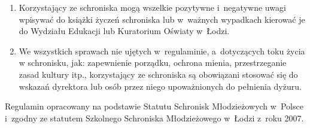 \begin{enumerate}
\item Korzystający ze schroniska mogą wszelkie pozytywne i~negatywne uwagi wpisywać do książki życzeń schroniska lub w~ważnych wypadkach kierować je do Wydziału Edukacji lub Kuratorium Oświaty w~Łodzi.
\item We wszystkich sprawach nie ujętych w~regulaminie, a~dotyczących toku życia w schronisku, jak: zapewnienie porządku, ochrona mienia, przestrzeganie zasad kultury itp., korzystający ze schroniska są obowiązani stosować się do wskazań dyrektora lub osób przez niego upoważnionych do pełnienia dyżuru.
\end{enumerate}
\noindent Regulamin opracowany na podstawie Statutu Schronisk Młodzieżowych w~Polsce i~zgodny ze statutem Szkolnego Schroniska Młodzieżowego w~Łodzi z~roku 2007.